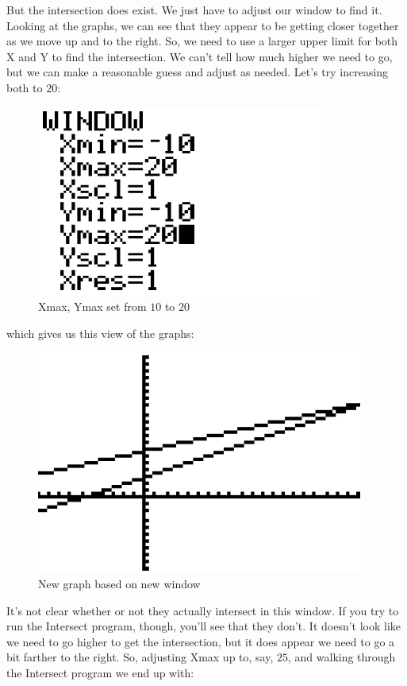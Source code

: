 {	But the intersection does exist. We just have to adjust our window to find it. Looking at the graphs, we can see that they appear to be getting closer together as we move up and to the right.  So, we need to use a larger upper limit for both X and Y to find the intersection. We can’t tell how much higher we need to go, but we can make a reasonable guess and adjust as needed. Let’s try increasing both to $20$:
	
	\begin{figure}[H]
		\centering
		\includegraphics[scale=1.0]{Sections/SolvingEquationsGraphically/Figure18.png}
		\caption{Xmax, Ymax set from $10$ to $20$}
	\end{figure}
	
	which gives us this view of the graphs:
	
	\begin{figure}[H]
		\centering
		\includegraphics[scale=1.0]{Sections/SolvingEquationsGraphically/Figure19.png}
		\caption{New graph based on new window}
	\end{figure}
	
	It’s not clear whether or not they actually intersect in this window. If you try to run the Intersect program, though, you’ll see that they don’t. It doesn’t look like we need to go higher to get the intersection, but it does appear we need to go a bit farther to the right. So, adjusting Xmax up to, say, $25$, and walking through the Intersect program we end up with:
	
}
